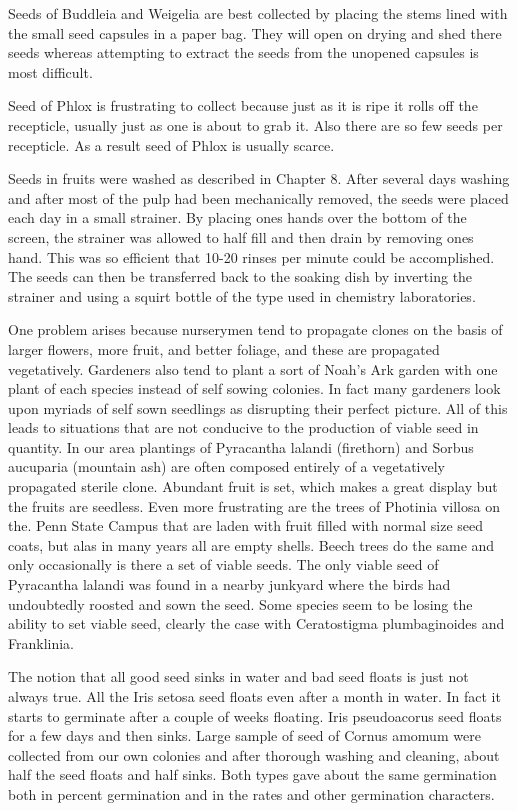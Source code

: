 Seeds of Buddleia and Weigelia are best collected by placing the stems lined
with the small seed capsules in a paper bag. They will open on drying and shed there
seeds whereas attempting to extract the seeds from the unopened capsules is most
difficult.

Seed of Phlox is frustrating to collect because just as it is ripe it rolls off the
recepticle, usually just as one is about to grab it. Also there are so few seeds per
recepticle. As a result seed of Phlox is usually scarce.

Seeds in fruits were washed as described in Chapter 8. After several days
washing and after most of the pulp had been mechanically removed, the seeds were
placed each day in a small strainer. By placing ones hands over the bottom of the
screen, the strainer was allowed to half fill and then drain by removing ones hand.
This was so efficient that 10-20 rinses per minute could be accomplished. The seeds
can then be transferred back to the soaking dish by inverting the strainer and using a
squirt bottle of the type used in chemistry laboratories.

One problem arises because nurserymen tend to propagate clones on the basis
of larger flowers, more fruit, and better foliage, and these are propagated vegetatively.
Gardeners also tend to plant a sort of Noah's Ark garden with one plant of each
species instead of self sowing colonies. In fact many gardeners look upon myriads of
self sown seedlings as disrupting their perfect picture. All of this leads to situations
that are not conducive to the production of viable seed in quantity. In our area
plantings of Pyracantha lalandi (firethorn) and Sorbus aucuparia (mountain ash) are
often composed entirely of a vegetatively propagated sterile clone. Abundant fruit is
set, which makes a great display but the fruits are seedless. Even more frustrating are
the trees of Photinia villosa on the. Penn State Campus that are laden with fruit filled
with normal size seed coats, but alas in many years all are empty shells. Beech trees
do the same and only occasionally is there a set of viable seeds. The only viable seed
of Pyracantha lalandi was found in a nearby junkyard where the birds had
undoubtedly roosted and sown the seed. Some species seem to be losing the ability
to set viable seed, clearly the case with Ceratostigma plumbaginoides and Franklinia.

The notion that all good seed sinks in water and bad seed floats is just not
always true. All the Iris setosa seed floats even after a month in water. In fact it starts
to germinate after a couple of weeks floating. Iris pseudoacorus seed floats for a few
days and then sinks. Large sample of seed of Cornus amomum were collected from
our own colonies and after thorough washing and cleaning, about half the seed floats
and half sinks. Both types gave about the same germination both in percent
germination and in the rates and other germination characters.

